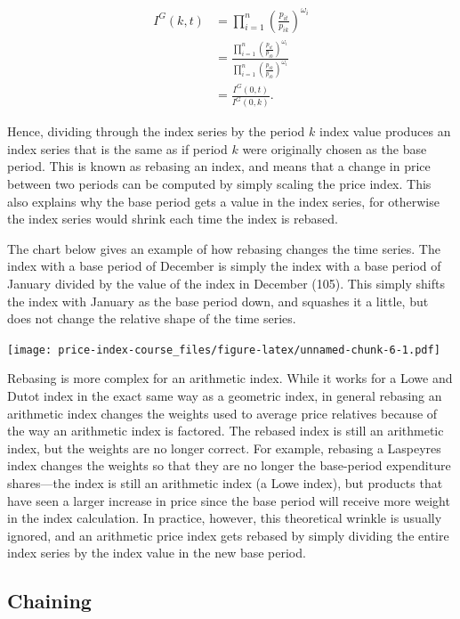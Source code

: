 \documentclass[]{article}
\begin{document}
\begin{align*}
I^{G}(k, t) &= \prod_{i = 1}^{n} \left(\frac{p_{it}}{p_{ik}}\right)^{\omega_{i}} \\
&= \frac{\prod_{i = 1}^{n} \left(\frac{p_{it}}{p_{i0}}\right)^{\omega_{i}}}{\prod_{i = 1}^{n} \left(\frac{p_{ik}}{p_{i0}}\right)^{\omega_{i}}} \\
&= \frac{I^{G}(0, t)}{I^{G}(0, k)}.
\end{align*}

Hence, dividing through the index series by the period \(k\) index value produces an index series that is the same as if period \(k\) were originally chosen as the base period. This is known as rebasing an index, and means that a change in price between two periods can be computed by simply scaling the price index. This also explains why the base period gets a value in the index series, for otherwise the index series would shrink each time the index is rebased.

The chart below gives an example of how rebasing changes the time series. The index with a base period of December is simply the index with a base period of January divided by the value of the index in December (105). This simply shifts the index with January as the base period down, and squashes it a little, but does not change the relative shape of the time series.

\texttt{[image: price-index-course\_files/figure-latex/unnamed-chunk-6-1.pdf]}

Rebasing is more complex for an arithmetic index. While it works for a Lowe and Dutot index in the exact same way as a geometric index, in general rebasing an arithmetic index changes the weights used to average price relatives because of the way an arithmetic index is factored. The rebased index is still an arithmetic index, but the weights are no longer correct. For example, rebasing a Laspeyres index changes the weights so that they are no longer the base-period expenditure shares---the index is still an arithmetic index (a Lowe index), but products that have seen a larger increase in price since the base period will receive more weight in the index calculation. In practice, however, this theoretical wrinkle is usually ignored, and an arithmetic price index gets rebased by simply dividing the entire index series by the index value in the new base period.

\hypertarget{chaining}{%
\subsection{Chaining}\label{chaining}}
\end{document}

